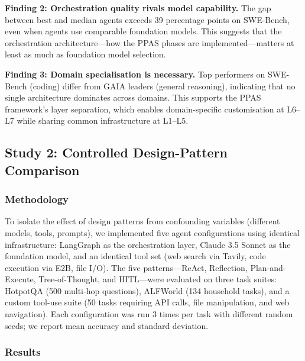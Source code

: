 \documentclass[review,authoryear]{elsarticle}
\theoremstyle{definition}
\begin{document}
\textbf{Finding 2: Orchestration quality rivals model capability.} The gap between best and median agents exceeds 39 percentage points on SWE-Bench, even when agents use comparable foundation models. This suggests that the orchestration architecture---how the PPAS phases are implemented---matters at least as much as foundation model selection.

\textbf{Finding 3: Domain specialisation is necessary.} Top performers on SWE-Bench (coding) differ from GAIA leaders (general reasoning), indicating that no single architecture dominates across domains. This supports the PPAS framework's layer separation, which enables domain-specific customisation at L6--L7 while sharing common infrastructure at L1--L5.

\subsection{Study 2: Controlled Design-Pattern Comparison}\label{sec:pattern-eval}

\subsubsection{Methodology}

To isolate the effect of design patterns from confounding variables (different models, tools, prompts), we implemented five agent configurations using identical infrastructure: LangGraph \citep{langchain2024langgraph} as the orchestration layer, Claude 3.5 Sonnet \citep{anthropic2024claude} as the foundation model, and an identical tool set (web search via Tavily, code execution via E2B, file I/O). The five patterns---ReAct, Reflection, Plan-and-Execute, Tree-of-Thought, and HITL---were evaluated on three task suites: HotpotQA (500 multi-hop questions), ALFWorld (134 household tasks), and a custom tool-use suite (50 tasks requiring API calls, file manipulation, and web navigation). Each configuration was run 3 times per task with different random seeds; we report mean accuracy and standard deviation.

\subsubsection{Results}
\end{document}
